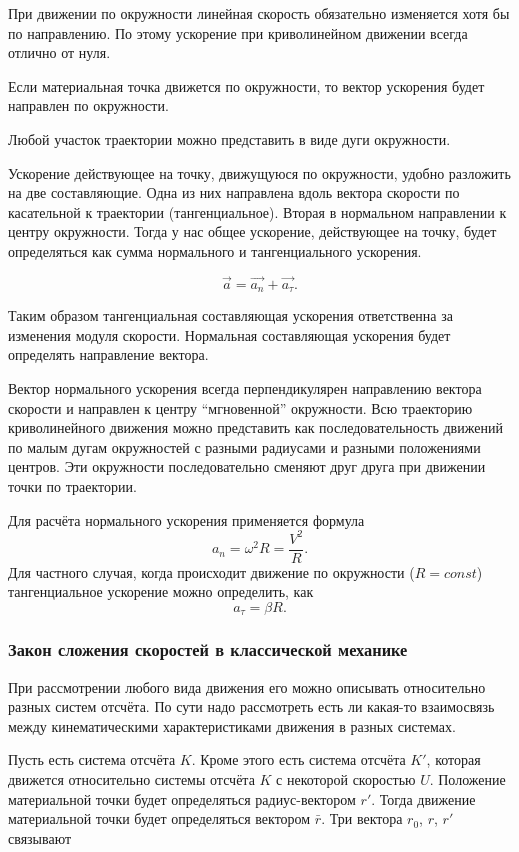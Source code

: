 \documentclass[10pt]{scrbook}
\begin{document}
При движении по окружности линейная скорость обязательно изменяется хотя бы по
направлению. По этому ускорение при криволинейном движении всегда отлично от
нуля.

Если материальная точка движется по окружности, то вектор ускорения будет
направлен по окружности.

Любой участок траектории можно представить в виде дуги окружности.

Ускорение действующее на точку, движущуюся по окружности, удобно разложить на
две составляющие. Одна из них направлена вдоль вектора скорости по касательной
к траектории (тангенциальное). Вторая в нормальном направлении к центру
окружности. Тогда у нас общее ускорение, действующее на точку, будет
определяться как сумма нормального и тангенциального ускорения.

\[
	\vec{a} = \vec{a_n} + \vec{a_\tau}
	.\]

Таким образом тангенциальная составляющая ускорения ответственна за изменения
модуля скорости. Нормальная составляющая ускорения будет определять направление
вектора.

Вектор нормального ускорения всегда перпендикулярен направлению вектора
скорости и направлен к центру ``мгновенной'' окружности. Всю траекторию
криволинейного движения можно представить как последовательность движений по
малым дугам окружностей с разными радиусами и разными положениями центров. Эти
окружности последовательно сменяют друг друга при движении точки по траектории.

Для расчёта нормального ускорения применяется формула \[
	a_n = \omega^2 R = \frac{V^2 }{R}
	.\] Для частного случая, когда происходит движение по окружности (\( R =
const \)) тангенциальное ускорение можно определить, как \[
	a_\tau = \beta R
	.\]

\subsubsection{Закон сложения скоростей в классической механике}

При рассмотрении любого вида движения его можно описывать относительно разных
систем отсчёта. По сути надо рассмотреть есть ли какая-то взаимосвязь между
кинематическими характеристиками движения в разных системах.

Пусть есть система отсчёта \( K \). Кроме этого есть система отсчёта \( K' \),
которая движется относительно системы отсчёта \( K \) с некоторой скоростью \(
U \). Положение материальной точки будет определяться радиус-вектором \( r' \).
Тогда движение материальной точки будет определяться вектором \( \bar{r} \).
Три вектора \( r_0 \), \( r \), \( r' \) связывают
\end{document}
